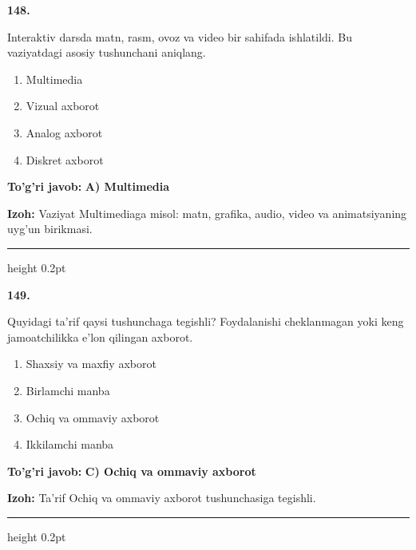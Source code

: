 \documentclass[10pt,a4paper,oneside]{article}
\begin{document}
\noindent\textbf{\color{ink}148.}
\par
Interaktiv darsda matn, rasm, ovoz va video bir sahifada ishlatildi. Bu vaziyatdagi asosiy tushunchani aniqlang.
\begin{enumerate}[label=\Alph*),leftmargin=9mm]
\item Multimedia
\item Vizual axborot
\item Analog axborot
\item Diskret axborot
\end{enumerate}
\begin{tcolorbox}[enhanced,breakable,colback=teal!4,colframe=teal!50!black,boxrule=0.5pt,arc=1.1mm,left=3mm,right=3mm,top=1.7mm,bottom=1.7mm,before skip=2mm,after skip=2mm]
\textbf{\color{teal}To'g'ri javob:} \textbf{A) Multimedia}
\par\smallskip
\textbf{Izoh:} Vaziyat Multimediaga misol: matn, grafika, audio, video va animatsiyaning uyg'un birikmasi.
\end{tcolorbox}
\vspace{2mm}\hrule height 0.2pt \vspace{3mm}

\noindent\textbf{\color{ink}149.}
\par
Quyidagi ta'rif qaysi tushunchaga tegishli? Foydalanishi cheklanmagan yoki keng jamoatchilikka e'lon qilingan axborot.
\begin{enumerate}[label=\Alph*),leftmargin=9mm]
\item Shaxsiy va maxfiy axborot
\item Birlamchi manba
\item Ochiq va ommaviy axborot
\item Ikkilamchi manba
\end{enumerate}
\begin{tcolorbox}[enhanced,breakable,colback=teal!4,colframe=teal!50!black,boxrule=0.5pt,arc=1.1mm,left=3mm,right=3mm,top=1.7mm,bottom=1.7mm,before skip=2mm,after skip=2mm]
\textbf{\color{teal}To'g'ri javob:} \textbf{C) Ochiq va ommaviy axborot}
\par\smallskip
\textbf{Izoh:} Ta'rif Ochiq va ommaviy axborot tushunchasiga tegishli.
\end{tcolorbox}
\vspace{2mm}\hrule height 0.2pt \vspace{3mm}
\end{document}
